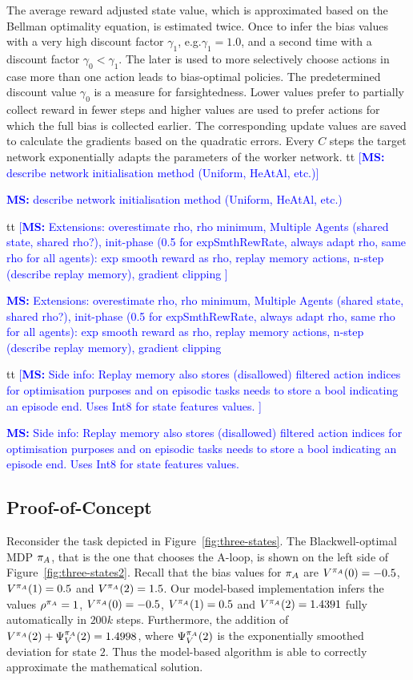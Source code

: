 \documentclass[envcountsame]{llncs}
\newcommand\MS[2][r]{\ifx t#1 \textcolor{blue}{[\textbf{MS:} #2]}
  \else \begin{center}\textcolor{blue}{\textbf{MS:} #2} \end{center} \fi}
\begin{document}
The average reward adjusted state value, which is approximated based on the Bellman optimality
equation, is estimated twice. Once to infer the bias values with a very high discount factor
\(\gamma_{1}\), e.g.\@ \(\gamma_{1} = 1.0\), and a second time with a discount factor
\(\gamma_{0} < \gamma_{1}\). The later is used to more selectively choose actions in case more than
one action leads to bias-optimal policies. The predetermined discount value \(\gamma_{0}\) is a
measure for farsightedness. Lower values prefer to partially collect reward in fewer steps and
higher values are used to prefer actions for which the full bias is collected earlier.
%
The corresponding update values are saved to calculate the gradients based on the quadratic errors.
Every \(C\) steps the target network exponentially adapts the parameters of the worker network.
%
%
%
%
\MS[t]{describe network initialisation method (Uniform, HeAtAl, etc.)}
%
\MS[t]{Extensions: overestimate rho, rho minimum, Multiple Agents (shared state,  shared rho?),
  init-phase (0.5 for expSmthRewRate, always adapt rho, same rho for all agents): exp smooth reward
  as rho, replay memory actions, n-step (describe replay memory), gradient clipping }
\MS[t]{Side info: Replay memory also stores (disallowed) filtered action indices for optimisation purposes and on
episodic tasks needs to store a bool indicating an episode end. Uses Int8 for state features values.  }


\subsection{Proof-of-Concept}
\label{subsec:Proof-of-Concept}

Reconsider the task depicted in Figure~\ref{fig:three-states}. The Blackwell-optimal MDP
\(\pi_{A}\), that is the one that chooses the A-loop, is shown on the left side of
Figure~\ref{fig:three-states2}. Recall that the bias values for \(\pi_{A}\) are
\(V^{\pi_{A}}(0)=-0.5\), \(V^{\pi_{A}}(1)=0.5\) and \(V^{\pi_{A}}(2)=1.5\). Our model-based
implementation infers the values \(\rho^{\pi_{A}} = 1\), \(V^{\pi_{A}}(0)=-0.5\), \(V^{\pi_{A}}(1)=0.5\)
and \(V^{\pi_{A}}(2)=1.4391\) fully automatically in \(200k\) steps. Furthermore, the addition of
\(V^{\pi_{A}}(2) + \Psi^{\pi_{A}}_{V}(2) = 1.4998\), where \(\Psi^{\pi_{A}}_{V}(2)\) is the exponentially
smoothed deviation for state \(2\). Thus the model-based algorithm is able to correctly approximate
the mathematical solution.
\end{document}
